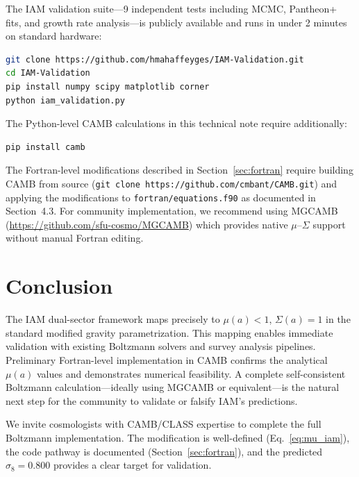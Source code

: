 \documentclass[11pt,letterpaper]{article}
\begin{document}
The IAM validation suite---9 independent tests including MCMC, Pantheon+ fits, and growth rate analysis---is publicly available and runs in under 2 minutes on standard hardware:

\begin{lstlisting}[language=bash]
git clone https://github.com/hmahaffeyges/IAM-Validation.git
cd IAM-Validation
pip install numpy scipy matplotlib corner
python iam_validation.py
\end{lstlisting}

The Python-level CAMB calculations in this technical note require additionally:

\begin{lstlisting}[language=bash]
pip install camb
\end{lstlisting}

The Fortran-level modifications described in Section~\ref{sec:fortran} require building CAMB from source (\texttt{git clone https://github.com/cmbant/CAMB.git}) and applying the modifications to \texttt{fortran/equations.f90} as documented in Section~4.3. For community implementation, we recommend using MGCAMB (\url{https://github.com/sfu-cosmo/MGCAMB}) which provides native $\mu$--$\Sigma$ support without manual Fortran editing.

\section{Conclusion}

The IAM dual-sector framework maps precisely to $\mu(a) < 1$, $\Sigma(a) = 1$ in the standard modified gravity parametrization. This mapping enables immediate validation with existing Boltzmann solvers and survey analysis pipelines. Preliminary Fortran-level implementation in CAMB confirms the analytical $\mu(a)$ values and demonstrates numerical feasibility. A complete self-consistent Boltzmann calculation---ideally using MGCAMB or equivalent---is the natural next step for the community to validate or falsify IAM's predictions.

We invite cosmologists with CAMB/CLASS expertise to complete the full Boltzmann implementation. The modification is well-defined (Eq.~\ref{eq:mu_iam}), the code pathway is documented (Section~\ref{sec:fortran}), and the predicted $\sigma_8 = 0.800$ provides a clear target for validation.
\end{document}

